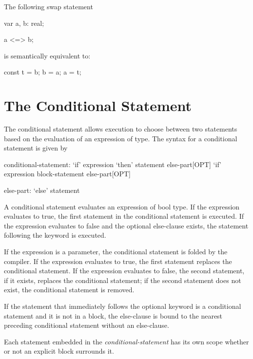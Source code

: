 \begin{example}
The following swap statement
\begin{chapel}
var a, b: real;

a <=> b;
\end{chapel}
is semantically equivalent to:
\begin{chapel}
const t = b;
b = a;
a = t;
\end{chapel}
\end{example}

\section{The Conditional Statement}
\label{The_Conditional_Statement}

The conditional statement allows execution to choose between two
statements based on the evaluation of an expression of 
type. The syntax for a conditional statement is given by
\begin{syntax}
conditional-statement:
  `if' expression `then' statement else-part[OPT]
  `if' expression block-statement else-part[OPT]

else-part:
  `else' statement
\end{syntax}

A conditional statement evaluates an expression of bool type. If the
expression evaluates to true, the first statement in the conditional
statement is executed.  If the expression evaluates to false and the
optional else-clause exists, the statement following the
 keyword is executed.

If the expression is a parameter, the conditional statement is folded
by the compiler. If the expression evaluates to true, the first
statement replaces the conditional statement. If the expression
evaluates to false, the second statement, if it exists, replaces the
conditional statement; if the second statement does not exist, the
conditional statement is removed.

If the statement that immediately follows the optional 
keyword is a conditional statement and it is not in a block, the
else-clause is bound to the nearest preceding conditional statement
without an else-clause.

Each statement embedded in the {\em conditional-statement} has its own
scope whether or not an explicit block surrounds it.

